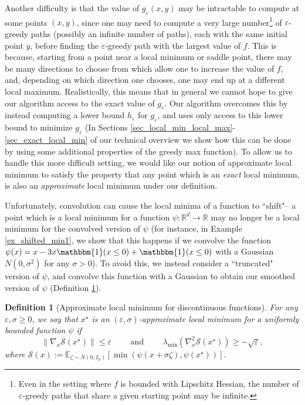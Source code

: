 \documentclass[11pt,letterpaper]{article}
\renewcommand{\epsilon}{\varepsilon}
\newcommand{\coloneqq}{:=}
\newtheorem{definition}[theorem]{Definition}
\begin{document}
    Another difficulty is that the value of $g_\epsilon(x,y)$ may be intractable to compute at some points $(x,y)$, since one may need to compute a very large number\footnote{Even in the setting where $f$ is bounded with Lipschitz Hessian, the number of $\epsilon$-greedy paths that share a given starting point may be infinite.} of $\epsilon$-greedy paths (possibly an infinite number of paths), each with the same initial point $y$, before finding the $\epsilon$-greedy path with the largest value of $f$.  
    This is because, starting from a point near a local minimum or saddle point, there may be many directions to choose from which allow one to increase the value of $f$, and, depending on which direction one chooses, one may end up at a different local maximum. 
%   
   Realistically, this means that in general we cannot hope to give our algorithm access to the exact value of $g_\epsilon$.
   Our algorithm overcomes this by instead computing a lower bound $h_\epsilon$ for $g_\epsilon$, and uses only access to this lower bound to minimize $g_\epsilon$ (In Sections \ref{sec_local_min_local_max}-\ref{sec_exact_local_min} of our technical overview we show how this can be done by using some additional properties of the greedy max function). 
      To allow us to handle this more difficult setting, %
       we would like our notion of approximate local minimum to satisfy the property that any point which is an {\em exact} local minimum, is also an {\em approximate} local minimum under our definition.
    
Unfortunately, convolution can cause the local minima of a function to ``shift"-- a point which is a local minimum for a function $\psi: \mathbb{R}^d \rightarrow \mathbb{R}$  may no longer be a local minimum for the convolved version of $\psi$ (for instance, in Example \ref{ex_shifted_min1}, we show that this happens if we convolve the function $\psi(x) = x - 3x \mathbbm{1}(x\leq 0) + \mathbbm{1}(x \leq 0)$ with a Gaussian $N(0,\sigma^2)$ for any $\sigma>0$).
%
%
To avoid this, we instead consider a ``truncated" version of $\psi$, and convolve this function with a Gaussian to obtain our smoothed version of $\psi$ (Definition \ref{def_discontinuos_local_min}).
%


  \begin{definition} [Approximate local minimum for discontinuous functions]  \label{def_discontinuos_local_min}
  For any $\epsilon, \sigma \geq 0$, we say that $x^\star$ is an $(\epsilon, \sigma)$-approximate local minimum for a uniformly bounded function $\psi$ if
  \begin{equation} \label{eq_local_lemma2}
 \| \nabla_{x}  \mathcal{S}(x^\star) \| \leq \epsilon \qquad \textrm{ and } \qquad
%
%
   \lambda_{\mathrm{min}}( \nabla^2_{x}   \mathcal{S}(x^\star) ) \geq -\sqrt{\epsilon},
  \end{equation}
  where $\mathcal{S}(x) \coloneqq \mathbb{E}_{\zeta \sim N(0,I_d)}\left [\min(\psi(x  + \sigma \zeta),  \psi(x^\star)) \right].$
  \end{definition}
\end{document}
